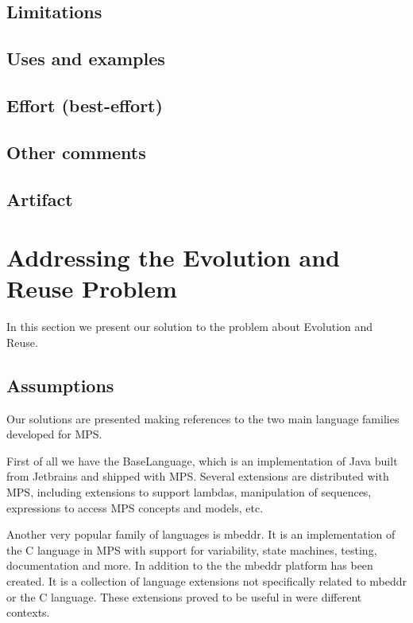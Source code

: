 \documentclass[preprint,numbers,10pt]{sigplanconf}
\begin{document}
\subsection{Limitations}

\subsection{Uses and examples}

\subsection{Effort (best-effort)}

\subsection{Other comments}

\subsection{Artifact}

%
%

\section{Addressing the Evolution and Reuse Problem}

In this section we present our solution to the problem about Evolution and Reuse.

\subsection{Assumptions}

Our solutions are presented making references to the two main language families developed for MPS.

First of all we have the BaseLanguage, which is an implementation of Java built from Jetbrains and shipped with MPS. Several extensions are distributed with MPS, including extensions to support lambdas, manipulation of sequences, expressions to access MPS concepts and models, etc.

Another very popular family of languages is mbeddr. It is an implementation of the C language in MPS with support for variability, state machines, testing, documentation and more. In addition to the the mbeddr platform has been created. It is a collection of language extensions not specifically related to mbeddr or the C language. These extensions proved to be useful in were different contexts.
\end{document}
